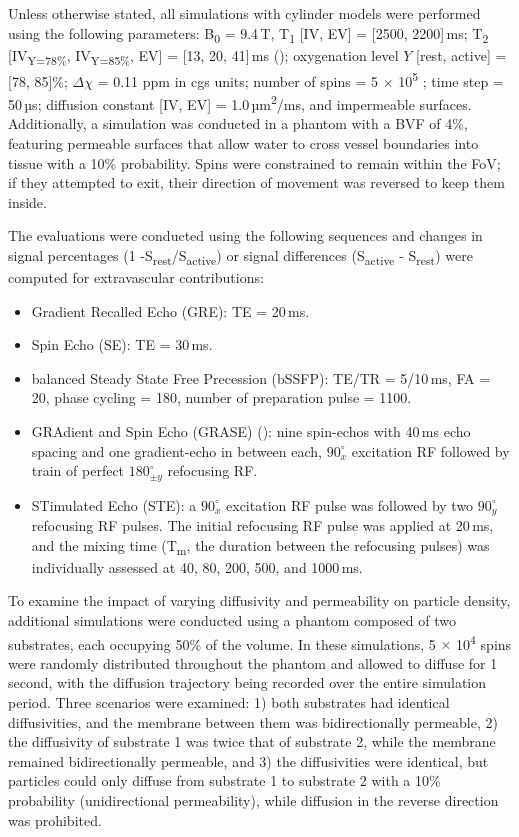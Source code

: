 Unless otherwise stated, all simulations with cylinder models were performed using the following parameters: B\textsubscript{0} = 9.4\,T, T\textsubscript{1} [IV, EV] = [2500, 2200]\,ms; T\textsubscript{2} [IV\textsubscript{Y=78\%}, IV\textsubscript{Y=85\%}, EV] = [13, 20, 41]\,ms (\cite{khajehim2017investigating}); oxygenation level \(Y\) [rest, active] = [78, 85]\%; \(\Delta\chi\) = 0.11 ppm in cgs units; number of spins = 5 \(\times\) 10\textsuperscript{5} ; time step = 50\,µs; diffusion constant [IV, EV] = 1.0\,µm\textsuperscript{2}/ms, and impermeable surfaces. Additionally, a simulation was conducted in a phantom with a BVF of 4\%, featuring permeable surfaces that allow water to cross vessel boundaries into tissue with a 10\% probability. Spins were constrained to remain within the FoV; if they attempted to exit, their direction of movement was reversed to keep them inside. 


The evaluations were conducted using the following sequences and changes in signal percentages (1 -S\textsubscript{rest}/S\textsubscript{active}) or signal differences (S\textsubscript{active} - S\textsubscript{rest}) were computed for extravascular contributions: 

\begin{itemize}
    \item Gradient Recalled Echo (GRE): TE = 20\,ms.
    \item Spin Echo (SE): TE = 30\,ms.
    \item balanced Steady State Free Precession (bSSFP): TE/TR = 5/10\,ms, FA = 20\textdegree, phase cycling = 180\textdegree, number of preparation pulse = 1100.
    \item GRAdient and Spin Echo (GRASE) (\cite{feinberg1991grase, constable1994functional}): nine spin-echos with 40\,ms echo spacing and one gradient-echo in between each, $90^\circ_x$ excitation RF followed by train of perfect $180^\circ_{\pm y}$ refocusing RF. 
    \item STimulated Echo (STE): a $90^\circ_x$ excitation RF pulse was followed by two $90^\circ_y$ refocusing RF pulses. The initial refocusing RF pulse was applied at 20\,ms, and the mixing time (T\textsubscript{m}, the duration between the refocusing pulses) was individually assessed at 40, 80, 200, 500, and 1000\,ms.
\end{itemize}

To examine the impact of varying diffusivity and permeability on particle density, additional simulations were conducted using a phantom composed of two substrates, each occupying 50\% of the volume. In these simulations, 5 \(\times\) 10\textsuperscript{4} spins were randomly distributed throughout the phantom and allowed to diffuse for 1 second, with the diffusion trajectory being recorded over the entire simulation period. Three scenarios were examined: 1) both substrates had identical diffusivities, and the membrane between them was bidirectionally permeable, 2) the diffusivity of substrate 1 was twice that of substrate 2, while the membrane remained bidirectionally permeable, and 3) the diffusivities were identical, but particles could only diffuse from substrate 1 to substrate 2 with a 10\% probability (unidirectional permeability), while diffusion in the reverse direction was prohibited.

